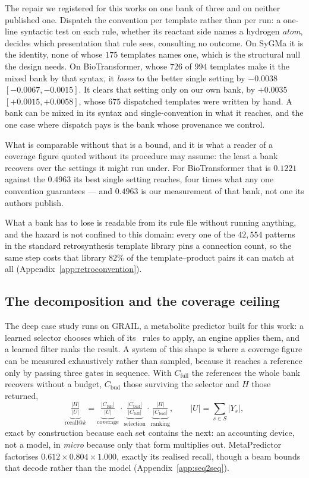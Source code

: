 The repair we registered for this works on one bank of three and on neither published one. Dispatch
the convention per template rather than per run: a one-line syntactic test on each rule, whether its
reactant side names a hydrogen \emph{atom}, decides which presentation that rule sees, consulting no
outcome. On SyGMa it is the identity, none of whose $175$ templates names one, which is the
structural null the design needs. On BioTransformer, whose $726$ of $994$ templates make it the
mixed bank by that syntax, it \emph{loses} to the better single setting by $-0.0038$
$[-0.0067,-0.0015]$. It clears that setting only on our own bank, by $+0.0035$ $[+0.0015,+0.0058]$,
whose $675$ dispatched templates were written by hand. A bank can be mixed in its syntax and
single-convention in what it reaches, and the one case where dispatch pays is the bank whose
provenance we control.

What is comparable without that is a bound, and it is what a reader of a coverage figure quoted
without its procedure may assume: the least a bank recovers over the settings it might run under.
For BioTransformer that is $0.1221$ against the $0.4963$ its best single setting reaches, four
times what any one convention guarantees --- and $0.4963$ is our measurement of that bank, not one
its authors publish.

What a bank has to lose is readable from its rule file without running anything, and the hazard is
not confined to this domain: every one of the $42{,}554$ patterns in the standard retrosynthesis
template library pins a connection count, so the same step costs that library $82\%$ of the
template--product pairs it can match at all (Appendix~\ref{app:retroconvention}).



\subsection{The decomposition and the coverage ceiling}
\label{sec:decomp}

The deep case study runs on GRAIL, a metabolite predictor built for this work: a learned selector
chooses which of its \nbank\ rules to apply, an engine applies them, and a learned filter ranks the
result. A system of this shape is where a coverage figure can be measured exhaustively rather than
sampled, because it reaches a reference only by passing three gates in sequence. With $C_{\text{full}}$
the references the whole bank recovers without a budget, $C_{\text{bud}}$ those surviving the selector
and $H$ those returned,
\[
\underbrace{\tfrac{|H|}{|U|}}_{\text{recall@}k}
=\underbrace{\tfrac{|C_{\text{full}}|}{|U|}}_{\text{coverage}}
\cdot\underbrace{\tfrac{|C_{\text{bud}}|}{|C_{\text{full}}|}}_{\text{selection}}
\cdot\underbrace{\tfrac{|H|}{|C_{\text{bud}}|}}_{\text{ranking}},
\qquad |U|=\textstyle\sum_{s\in S}|Y_s| ,
\]
exact by construction because each set contains the next: an accounting device, not a model, in
\emph{micro} because only that form multiplies out. MetaPredictor factorises
$0.612\times0.804\times1.000$, exactly its realised recall, though a beam bounds that decode rather
than the model (Appendix~\ref{app:seq2seq}).

